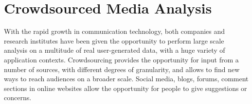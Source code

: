 \chapter{Crowdsourced Media Analysis}\label{ch2}
With the rapid growth in communication technology, both companies and research institutes have been given the opportunity to perform large scale analysis on a multitude of real user-generated data, with a huge variety of application contexts.
Crowdsourcing provides the opportunity for input from a number of sources, with different degrees of granularity, and allows to find new ways to reach audiences on a broader scale. %
Social media, blogs, forums, comment sections in online websites allow the opportunity for people to give suggestions or concerns.

